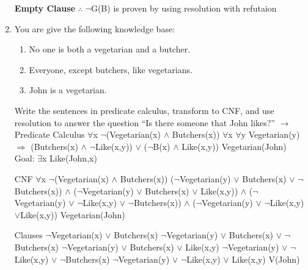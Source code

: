 \documentclass[10pt]{article}
\begin{document}
\begin{enumerate}
    \textbf{Empty Clause} \newline \newline
    $\therefore$ $\neg$G(B) is proven by using resolution with refutaion
    \newpage
    \item You are give the following knowledge base:
    	\begin{enumerate}
    		\item No one is both a vegetarian and a butcher.
            \item Everyone, except butchers, like vegetarians.
            \item John is a vegetarian.
    	\end{enumerate}
    Write the sentences in predicate calculus, transform to CNF, and use resolution to answer the question \enquote{Is there someone that John likes?} \newline
    $\rightarrow$ \newline
    Predicate Calculus \newline
    $\forall$x $\neg$(Vegetarian(x) $\wedge$ Butchers(x)) \newline
    $\forall$x $\forall$y Vegetarian(y) $\Rightarrow$ (Butchers(x) $\wedge$ $\neg$Like(x,y)) $\vee$ ($\neg$B(x) $\wedge$ Like(x,y)) \newline
    Vegetarian(John) \newline
    Goal: $\exists$x Like(John,x) \newline
    
    \hrulefill
    
    CNF \newline
    $\forall$x $\neg$(Vegetarian(x) $\wedge$ Butchers(x)) \newline
    ($\neg$Vegetarian(y) $\vee$ Butchers(x) $\vee$ $\neg$Butchers(x)) $\wedge$ ($\neg$Vegetarian(y) $\vee$ Butchers(x) $\vee$ Like(x,y)) $\wedge$ ($\neg$Vegetarian(y) $\vee$ $\neg$Like(x,y) $\vee$ $\neg$Butchers(x)) $\wedge$ ($\neg$Vegetarian(y) $\vee$ $\neg$Like(x,y) $\vee$Like(x,y)) \newline
    Vegetarian(John) \newline
    
    \hrulefill
    
    Clauses \newline
    $\neg$Vegetarian(x) $\vee$ Butchers(x) \newline
    $\neg$Vegetarian(y) $\vee$ Butchers(x) $\vee$ $\neg$Butchers(x) \newline
    $\neg$Vegetarian(y) $\vee$ Butchers(x) $\vee$ Like(x,y) \newline
    $\neg$Vegetarian(y) $\vee$ $\neg$Like(x,y) $\vee$ $\neg$Butchers(x) \newline
    $\neg$Vegetarian(y) $\vee$ $\neg$Like(x,y) $\vee$ Like(x,y) \newline
    V(John) \newline
    

\end{enumerate}
\end{document}
